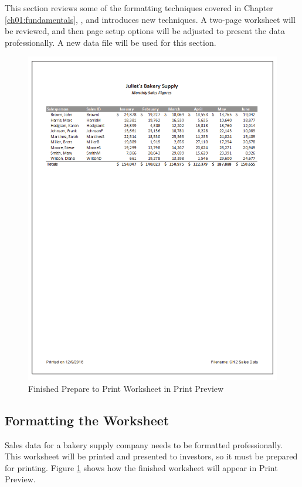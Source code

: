 This section reviews some of the formatting techniques covered in Chapter \ref{ch01:fundamentals}, , and introduces new techniques. A two-page worksheet will be reviewed, and then page setup options will be adjusted to present the data professionally. A new data file will be used for this section.

\begin{figure}[H]
	\centering
	\includegraphics[width=\maxwidth{.95\linewidth}]{gfx/ch02_fig40}
	\caption{Finished Prepare to Print Worksheet in Print Preview}
	\label{02:fig40}
\end{figure}

\subsection{Formatting the Worksheet}

Sales data for a bakery supply company needs to be formatted professionally. This worksheet will be printed and presented to investors, so it must be prepared for printing. Figure \ref{02:fig40} shows how the finished worksheet will appear in Print Preview.

